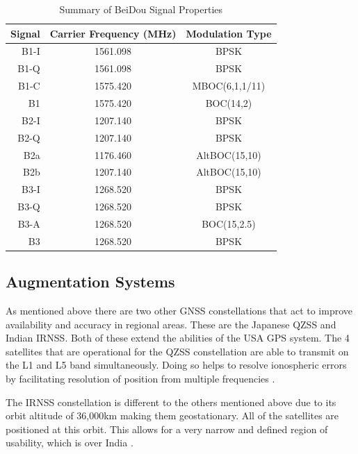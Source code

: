 \renewcommand{\arraystretch}{1.5}
\begin{table}
    \begin{center}
        \caption{Summary of BeiDou Signal Properties \cite{RN59}}
        \label{tab:Beidou Signal}
        \begin{tabular}{ r|c|c }
            \hline
            \textbf{Signal} & \textbf{Carrier Frequency (MHz)} & \textbf{Modulation Type} \\
            \hline
            B1-I & 1561.098 & BPSK\\
            B1-Q & 1561.098 & BPSK\\
            B1-C & 1575.420 & MBOC(6,1,1/11)\\
            B1 & 1575.420 & BOC(14,2)\\
            \hline
            B2-I & 1207.140 & BPSK\\
            B2-Q & 1207.140 & BPSK\\
            B2a & 1176.460 & AltBOC(15,10)\\
            B2b & 1207.140 & AltBOC(15,10)\\
            \hline
            B3-I & 1268.520 & BPSK\\
            B3-Q & 1268.520 & BPSK\\
            B3-A & 1268.520 & BOC(15,2.5)\\
            B3 & 1268.520 & BPSK\\
            \hline
        \end{tabular}
    \end{center}
\end{table}
\renewcommand{\arraystretch}{1}

\subsection{Augmentation Systems} \label{subsec:GNSS_OtherIntro}
As mentioned above there are two other GNSS constellations that act to improve availability and accuracy in regional areas. These are the Japanese QZSS and Indian
IRNSS. Both of these extend the abilities of the USA GPS system. The 4 satellites that are operational for the QZSS constellation are able to transmit on the L1 and L5
band  simultaneously. Doing so helps to resolve ionospheric errors by facilitating resolution of position from multiple frequencies \cite{RN48}.

The IRNSS constellation is different to the others mentioned above due to its orbit altitude of 36,000km making them geostationary. All of the satellites are positioned at
this orbit. This allows for a very narrow and defined region of usability, which is over India \cite{RN55}. 

